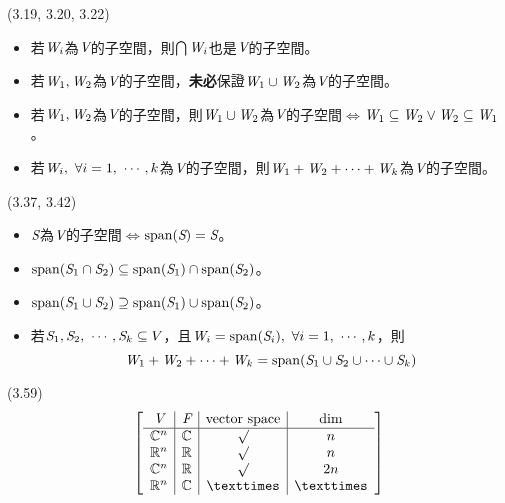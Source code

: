 \item \begin{theorem}{(3.19, 3.20, 3.22)} \quad\quad
	\begin{itemize}
		\item 若$\textit{W}_i$為$\textit{V}$的子空間，則$\bigcap\textit{W}_i$也是$\textit{V}$的子空間。
		\item 若$\textit{W}_1, \textit{W}_2$為$\textit{V}$的子空間，\textbf{未必}保證$\textit{W}_1 \cup \textit{W}_2$為$\textit{V}$的子空間。
		\item 若$\textit{W}_1, \textit{W}_2$為$\textit{V}$的子空間，則$\textit{W}_1 \cup \textit{W}_2$為$\textit{V}$的子空間$\iff$$\textit{W}_1 \subseteq \textit{W}_2 \lor \textit{W}_2 \subseteq \textit{W}_1$。
		\item 若$\spc{W}_i, \ \forall i = 1, \ \cdots, k$為$\textit{V}$的子空間，則$\textit{W}_1 + \textit{W}_2 + \cdots + \textit{W}_k$為$\textit{V}$的子空間。
	\end{itemize}
\end{theorem}

\item \begin{theorem}{(3.37, 3.42)} \quad\quad
	\begin{itemize}
		\item $\textit{S}$為$\textit{V}$的子空間$\iff$$\operatorname{span}(\textit{S}) = \textit{S}$。
		\item $\operatorname{span}(\textit{S}_1 \cap \textit{S}_2) \subseteq \operatorname{span}(\textit{S}_1) \cap \operatorname{span}(\textit{S}_2)$。
		\item $\operatorname{span}(\textit{S}_1 \cup \textit{S}_2) \supseteq \operatorname{span}(\textit{S}_1) \cup \operatorname{span}(\textit{S}_2)$。
		\item 若$\textit{S}_1, \textit{S}_2, \ \cdots, \textit{S}_k \subseteq V$，且$\textit{W}_i = \operatorname{span}(\textit{S}_i), \ \forall i = 1,\ \cdots, k$，則
		\begin{equation}
			\textit{W}_1 + \textit{W}_2 + \cdots + \textit{W}_k = \operatorname{span}(\textit{S}_1 \cup \textit{S}_2 \cup \cdots \cup \textit{S}_k)
		\end{equation}
	\end{itemize}
\end{theorem}

\item \begin{theorem}{(3.59)} \quad\quad \begin{equation}
		{\left[ 
		\begin{array}{c|c|c|c}
			\spc{V} & \F & \text{vector space} & \text{dim} \\
			\hline
			\C^n & \C & \surd & n \\
			\R^n & \R & \surd & n \\
			\C^n & \R & \surd & 2n \\
			\R^n & \C & \texttimes & \texttimes
		\end{array} 
		\right]}
	\end{equation}
\end{theorem}

